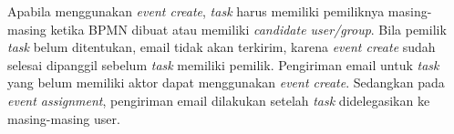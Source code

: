 Apabila menggunakan \textit{event create}, \textit{task} harus memiliki pemiliknya masing-masing ketika BPMN dibuat atau memiliki \textit{candidate user/group}. Bila pemilik \textit{task} belum ditentukan, email tidak akan terkirim, karena \textit{event create} sudah selesai dipanggil sebelum \textit{task} memiliki pemilik. Pengiriman email untuk \textit{task} yang belum memiliki aktor dapat menggunakan \textit{event create}. Sedangkan pada \textit{event assignment}, pengiriman email dilakukan setelah \textit{task} didelegasikan ke masing-masing user.




